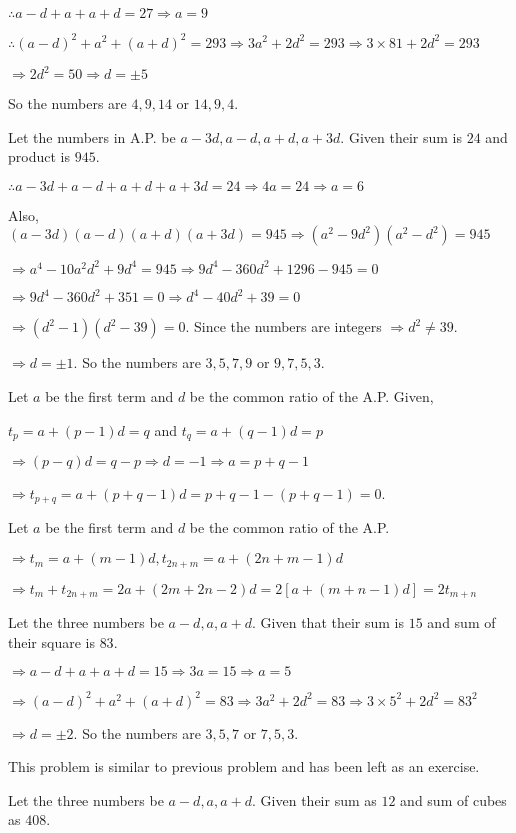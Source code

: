   $\therefore a - d + a + a + d = 27 \Rightarrow a = 9$

  $\therefore (a - d)^2 + a^2 + (a + d)^2 = 293 \Rightarrow 3a^2 + 2d^2 = 293 \Rightarrow 3\times81 + 2d^2 = 293$

  $\Rightarrow 2d^2 = 50 \Rightarrow d = \pm5$

  So the numbers are $4, 9, 14$ or $14, 9, 4$.
\item Let the numbers in A.P. be $a - 3d, a - d, a + d, a + 3d$. Given their sum is $24$ and product is $945$.

  $\therefore a - 3d + a - d + a + d + a + 3d = 24 \Rightarrow 4a = 24 \Rightarrow a = 6$

  Also, $(a - 3d)(a - d)(a + d)(a + 3d) = 945 \Rightarrow (a^2 - 9d^2)(a^2 - d^2) = 945$

  $\Rightarrow a^4 - 10a^2d^2 + 9d^4 = 945 \Rightarrow 9d^4 - 360d^2 + 1296 - 945 = 0$

  $\Rightarrow 9d^4 - 360d^2 + 351 = 0 \Rightarrow d^4 - 40d^2 + 39 = 0$

  $\Rightarrow (d^2 - 1)(d^2 - 39) = 0$. Since the numbers are integers $\Rightarrow d^2 \neq 39$.

  $\Rightarrow d = \pm 1$. So the numbers are $3, 5, 7, 9$ or $9, 7, 5, 3$.
\item Let $a$ be the first term and $d$ be the common ratio of the A.P. Given,

  $t_p = a + (p - 1)d = q$ and $t_q = a + (q - 1)d = p$

  $\Rightarrow (p - q)d = q - p \Rightarrow d = -1 \Rightarrow a = p + q - 1$

  $\Rightarrow t_{p + q} = a + (p + q - 1)d = p + q - 1 - (p + q - 1) = 0$.
\item Let $a$ be the first term and $d$ be the common ratio of the A.P.

  $\Rightarrow t_m = a + (m - 1)d, t_{2n + m} = a + (2n + m - 1)d$

  $\Rightarrow t_m + t_{2n + m} = 2a + (2m + 2n - 2)d = 2[a + (m + n - 1)d] = 2t_{m + n}$
\item Let the three numbers be $a - d, a, a + d$. Given that their sum is $15$ and sum of their square is $83$.

  $\Rightarrow a - d + a + a + d = 15 \Rightarrow 3a = 15 \Rightarrow a = 5$

  $\Rightarrow (a - d)^2 + a^2 + (a + d)^2 = 83 \Rightarrow 3a^2 + 2d^2 = 83 \Rightarrow 3\times5^2 + 2d^2 = 83^2$

  $\Rightarrow d = \pm2$. So the numbers are $3, 5, 7$ or $7, 5, 3$.
\item This problem is similar to previous problem and has been left as an exercise.
\item Let the three numbers be $a - d, a, a + d$. Given their sum as $12$ and sum of cubes as $408$.

